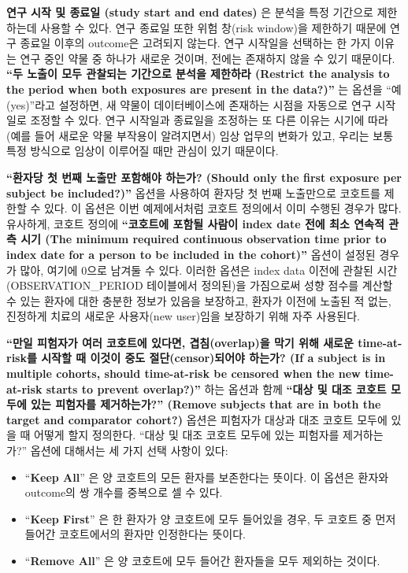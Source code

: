 \documentclass[11pt]{book}
\providecommand{\tightlist}{%
  \setlength{\itemsep}{0pt}\setlength{\parskip}{0pt}}
\theoremstyle{definition}
\theoremstyle{definition}
\theoremstyle{definition}
\theoremstyle{remark}
\begin{document}
\textbf{연구 시작 및 종료일 (study start and end dates)} 은 분석을 특정
기간으로 제한하는데 사용할 수 있다. 연구 종료일 또한 위험 창(risk
window)을 제한하기 때문에 연구 종료일 이후의 outcome은 고려되지 않는다.
연구 시작일을 선택하는 한 가지 이유는 연구 중인 약물 중 하나가 새로운
것이며, 전에는 존재하지 않을 수 있기 때문이다. \textbf{``두 노출이 모두
관찰되는 기간으로 분석을 제한하라 (Restrict the analysis to the period
when both exposures are present in the data?)''} 는 옵션을
``예(yes)''라고 설정하면, 새 약물이 데이터베이스에 존재하는 시점을
자동으로 연구 시작일로 조정할 수 있다. 연구 시작일과 종료일을 조정하는
또 다른 이유는 시기에 따라 (예를 들어 새로운 약물 부작용이 알려지면서)
임상 업무의 변화가 있고, 우리는 보통 특정 방식으로 임상이 이루어질 때만
관심이 있기 때문이다.

\textbf{``환자당 첫 번째 노출만 포함해야 하는가? (Should only the first
exposure per subject be included?)''} 옵션을 사용하여 환자당 첫 번째
노출만으로 코호트를 제한할 수 있다. 이 옵션은 이번 예제에서처럼 코호트
정의에서 이미 수행된 경우가 많다. 유사하게, 코호트 정의에
\textbf{``코호트에 포함될 사람이 index date 전에 최소 연속적 관측 시기
(The minimum required continuous observation time prior to index date
for a person to be included in the cohort)''} 옵션이 설정된 경우가 많아,
여기에 0으로 남겨둘 수 있다. 이러한 옵션은 index data 이전에 관찰된 시간
(OBSERVATION\_PERIOD 테이블에서 정의된)을 가짐으로써 성향 점수를 계산할
수 있는 환자에 대한 충분한 정보가 있음을 보장하고, 환자가 이전에 노출된
적 없는, 진정하게 치료의 새로운 사용자(new user)임을 보장하기 위해 자주
사용된다.

\textbf{``만일 피험자가 여러 코호트에 있다면, 겹침(overlap)을 막기 위해
새로운 time-at-risk를 시작할 때 이것이 중도 절단(censor)되어야 하는가?
(If a subject is in multiple cohorts, should time-at-risk be censored
when the new time-at-risk starts to prevent overlap?)''} 하는 옵션과
함께 \textbf{``대상 및 대조 코호트 모두에 있는 피험자를 제거하는가?''
(Remove subjects that are in both the target and comparator cohort?)}
옵션은 피험자가 대상과 대조 코호트 모두에 있을 때 어떻게 할지 정의한다.
``대상 및 대조 코호트 모두에 있는 피험자를 제거하는가?'' 옵션에 대해서는
세 가지 선택 사항이 있다:

\begin{itemize}
\tightlist
\item
  ``\textbf{Keep All}'' 은 양 코호트의 모든 환자를 보존한다는 뜻이다. 이
  옵션은 환자와 outcome의 쌍 개수를 중복으로 셀 수 있다.
\item
  ``\textbf{Keep First}'' 은 한 환자가 양 코호트에 모두 들어있을 경우,
  두 코호트 중 먼저 들어간 코호트에서의 환자만 인정한다는 뜻이다.
\item
  ``\textbf{Remove All}'' 은 양 코호트에 모두 들어간 환자들을 모두
  제외하는 것이다.
\end{itemize}
\end{document}
